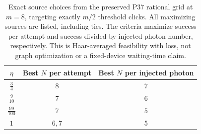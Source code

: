 \begin{table}[t]
\centering
\begin{tabular}{ccc}
\hline
$\eta$ & Best $N$ per attempt & Best $N$ per injected photon \\
\hline
$\frac{3}{4}$ & $8$ & $7$ \\
$\frac{9}{10}$ & $7$ & $6$ \\
$\frac{99}{100}$ & $7$ & $5$ \\
$1$ & $6, 7$ & $5$ \\
\hline
\end{tabular}
\caption{Exact source choices from the preserved P37 rational grid at $m=8$, targeting exactly $m/2$ threshold clicks. All maximizing sources are listed, including ties. The criteria maximize success per attempt and success divided by injected photon number, respectively. This is Haar-averaged feasibility with loss, not graph optimization or a fixed-device waiting-time claim.}
\label{tab:losses}
\end{table}
